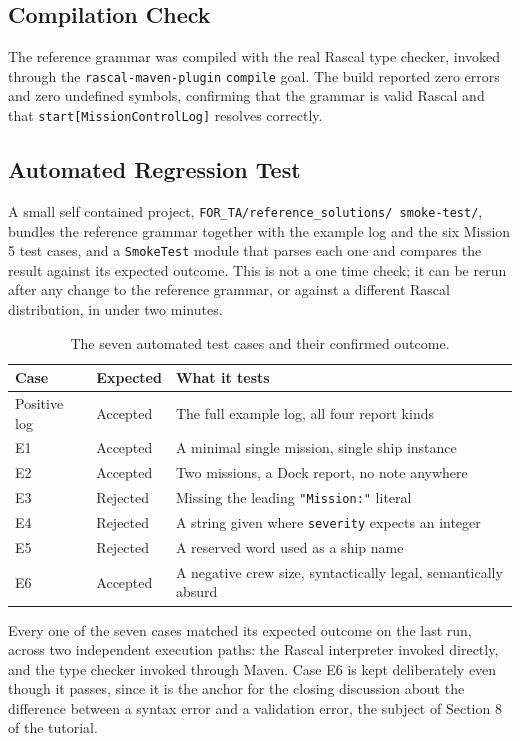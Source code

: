 \documentclass[11pt]{article}
\begin{document}
\subsection{Compilation Check}

The reference grammar was compiled with the real Rascal type checker,
invoked through the \texttt{rascal-maven-plugin} \texttt{compile} goal.
The build reported zero errors and zero undefined symbols, confirming that
the grammar is valid Rascal and that \texttt{start[MissionControlLog]}
resolves correctly.

\subsection{Automated Regression Test}

A small self contained project, \texttt{FOR\_TA/reference\_solutions/%
smoke-test/}, bundles the reference grammar together with the example log
and the six Mission 5 test cases, and a \texttt{SmokeTest} module that
parses each one and compares the result against its expected outcome. This
is not a one time check; it can be rerun after any change to the reference
grammar, or against a different Rascal distribution, in under two minutes.

\begin{table}[h!]
\centering
\small
\begin{tabular}{@{}l l l@{}}
\toprule
\textbf{Case} & \textbf{Expected} & \textbf{What it tests} \\
\midrule
Positive log & Accepted & The full example log, all four report kinds \\
E1 & Accepted & A minimal single mission, single ship instance \\
E2 & Accepted & Two missions, a Dock report, no note anywhere \\
E3 & Rejected & Missing the leading \texttt{"Mission:"} literal \\
E4 & Rejected & A string given where \texttt{severity} expects an integer \\
E5 & Rejected & A reserved word used as a ship name \\
E6 & Accepted & A negative crew size, syntactically legal, semantically absurd \\
\bottomrule
\end{tabular}
\caption{The seven automated test cases and their confirmed outcome.}
\end{table}

Every one of the seven cases matched its expected outcome on the last run,
across two independent execution paths: the Rascal interpreter invoked
directly, and the type checker invoked through Maven. Case E6 is kept
deliberately even though it passes, since it is the anchor for the closing
discussion about the difference between a syntax error and a validation
error, the subject of Section 8 of the tutorial.
\end{document}
